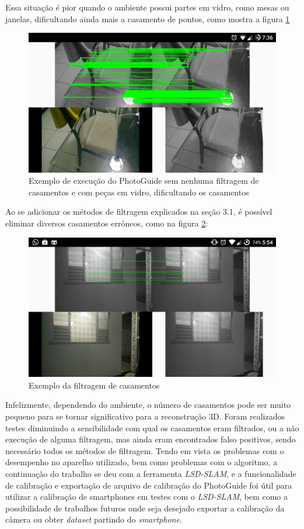 Essa situação é pior quando o ambiente possui partes em vidro, como mesas ou janelas, dificultando ainda mais a casamento de pontos, como mostra a figura \ref{fig4:3}

\begin{figure}[H]
	\centering
		\includegraphics[width= \textwidth]{Imagens/figura4-3.png}
	\caption{Exemplo de execução do PhotoGuide sem nenhuma filtragem de casamentos e com peças em vidro, dificultando os casamentos}
	\label{fig4:3}
\end{figure}

Ao se adicionar os métodos de filtragem explicados na seção 3.1, é possível eliminar diversos casamentos errôneos, como na figura \ref{fig4:4}:

\begin{figure}[H]
	\centering
		\includegraphics[width= \textwidth]{Imagens/figura3-2E4-4.png}
	\caption{Exemplo da filtragem de casamentos}
	\label{fig4:4}
\end{figure}

Infelizmente, dependendo do ambiente, o número de casamentos pode ser muito pequeno para se tornar significativo para a reconstrução 3D. Foram realizados testes diminuindo a sensibilidade com qual os casamentos eram filtrados, ou a não execução de alguma filtragem, mas ainda eram encontrados falso positivos, sendo necessário todos os métodos de filtragem. 
	Tendo em vista os problemas com o desempenho no aparelho utilizado, bem como problemas com o algoritmo, a continuação do trabalho se deu com a ferramenta \textit{LSD-SLAM}, e a funcionalidade de calibração e exportação de arquivo de calibração do PhotoGuide foi útil para utilizar a calibração de smartphones em testes com o \textit{LSD-SLAM}, bem como a possibilidade de trabalhos futuros onde seja desejado exportar a calibração da câmera ou obter \textit{dataset} partindo do \textit{smartphone}.
	
